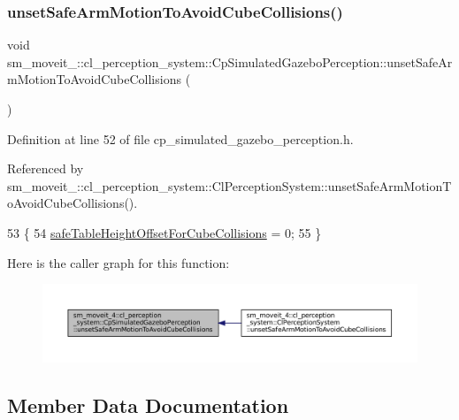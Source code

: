 \subsubsection{\texorpdfstring{unset\+Safe\+Arm\+Motion\+To\+Avoid\+Cube\+Collisions()}{unsetSafeArmMotionToAvoidCubeCollisions()}}
{\footnotesize\ttfamily void sm\+\_\+moveit\+\_\+::cl\+\_\+perception\+\_\+system\+::\+Cp\+Simulated\+Gazebo\+Perception\+::unset\+Safe\+Arm\+Motion\+To\+Avoid\+Cube\+Collisions (\begin{DoxyParamCaption}{ }\end{DoxyParamCaption})\hspace{0.3cm}{\ttfamily [inline]}}



Definition at line 52 of file cp\+\_\+simulated\+\_\+gazebo\+\_\+perception.\+h.



Referenced by sm\+\_\+moveit\+\_\+::cl\+\_\+perception\+\_\+system\+::\+Cl\+Perception\+System\+::unset\+Safe\+Arm\+Motion\+To\+Avoid\+Cube\+Collisions().


\begin{DoxyCode}
53             \{
54                  \hyperlink{classsm__moveit__4_1_1cl__perception__system_1_1CpSimulatedGazeboPerception_a6b6bafbddde1f72c81bf54aa75872151}{safeTableHeightOffsetForCubeCollisions} = 0;
55             \}
\end{DoxyCode}
Here is the caller graph for this function\+:
\nopagebreak
\begin{figure}[H]
\begin{center}
\leavevmode
\includegraphics[width=350pt]{classsm__moveit__4_1_1cl__perception__system_1_1CpSimulatedGazeboPerception_a7f5d68f2ff7dd0ade9756058e790efa1_icgraph}
\end{center}
\end{figure}


\subsection{Member Data Documentation}
\mbox{\label{classsm__moveit__4_1_1cl__perception__system_1_1CpSimulatedGazeboPerception_a5f043c05aa335a438459a55b51e6ace6}} 

